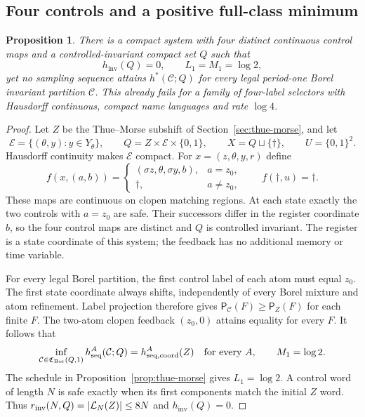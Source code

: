 \documentclass[11pt,reqno]{amsart}
\numberwithin{equation}{section}
\newtheorem{proposition}[theorem]{Proposition}
\theoremstyle{definition}
\theoremstyle{definition}
\newcommand{\C}{\mathcal C}
\newcommand{\Patt}{\mathsf P}
\newcommand{\hseq}{h_{\mathrm{seq}}}
\newcommand{\hpat}{h^{*}}
\newcommand{\hinv}{h_{\mathrm{inv}}}
\newcommand{\Bor}{\mathrm{Bor}}
\begin{document}
\subsection{Four controls and a positive full-class minimum}

\begin{proposition}\label{prop:finite-pointwise}
There is a compact system with four distinct continuous control
maps and a controlled-invariant compact set $Q$ such that
\[
 \hinv(Q)=0,\qquad L_1=M_1=\log2,
\]
yet no sampling sequence attains $\hpat(\C;Q)$ for every legal
period-one Borel invariant partition $\C$.
This already fails for a family of four-label selectors with
Hausdorff continuous, compact name languages and rate $\log4$.
\end{proposition}
\begin{proof}
Let $Z$ be the Thue--Morse subshift of
Section~\ref{sec:thue-morse}, and let
\[
 \mathcal E=\{(\theta,y):y\in Y_\theta\},\qquad
 Q=Z\times\mathcal E\times\{0,1\},\qquad
 X=Q\sqcup\{\dagger\},\qquad U=\{0,1\}^2.
\]
Hausdorff continuity makes $\mathcal E$ compact.
For $x=(z,\theta,y,r)$ define
\[
 f(x,(a,b))=
 \begin{cases}
  (\sigma z,\theta,\sigma y,b),&a=z_0,\\
  \dagger,&a\ne z_0,
 \end{cases}
 \qquad f(\dagger,u)=\dagger.
\]
These maps are continuous on clopen matching regions. At each
state exactly the two controls with $a=z_0$ are safe. Their
successors differ in the register coordinate $b$, so the four
control maps are distinct and $Q$ is controlled invariant.
The register is a state coordinate of this system; the feedback
has no additional memory or time variable.

For every legal Borel partition, the first control label of
each atom must equal $z_0$. The first state coordinate always
shifts, independently of every Borel mixture and atom refinement.
Label projection therefore gives
$\Patt_\C(F)\ge\Patt_Z(F)$ for each finite $F$.
The two-atom clopen feedback $(z_0,0)$ attains equality for
every $F$. It follows that
\[
 \inf_{\C\in\mathfrak C_{\Bor}(Q,1)}\hseq^A(\C;Q)
 =h_{\rm seq,coord}^A(Z)\quad\text{for every }A,
 \qquad M_1=\log2.
\]
The schedule in Proposition~\ref{prop:thue-morse} gives
$L_1=\log2$. A control word of length $N$ is safe exactly
when its first components match the initial $Z$ word.
Thus $r_{\rm inv}(N,Q)=|\mathcal L_N(Z)|\le8N$ and $\hinv(Q)=0$.


\end{proof}
\end{document}
